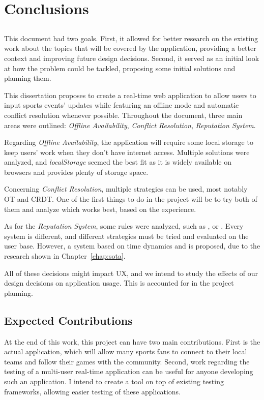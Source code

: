 \chapter{Conclusions} \label{chap:concl}

\section*{}

This document had two goals. First, it allowed for better research on the existing work about the topics that will be covered by the application, providing a better context and improving future design decisions. Second, it served as an initial look at how the problem could be tackled, proposing some initial solutions and planning them.

This dissertation proposes to create a real-time web application to allow users to input sports events' updates while featuring an offline mode and automatic conflict resolution whenever possible. Throughout the document, three main areas were outlined: \textit{Offline Availability}, \textit{Conflict Resolution}, \textit{Reputation System}. 

Regarding \textit{Offline Availability}, the application will require some local storage to keep users' work when they don't have internet access. Multiple solutions were analyzed, and \textit{localStorage} seemed the best fit as it is widely available on browsers and provides plenty of storage space.

Concerning \textit{Conflict Resolution}, multiple strategies can be used, most notably OT and CRDT. One of the first things to do in the project will be to try both of them and analyze which works best, based on the experience.

As for the \textit{Reputation System}, some rules were analyzed, such as , or . Every system is different, and different strategies must be tried and evaluated on the user base. However, a system based on time dynamics and  is proposed, due to the research shown in Chapter~\ref{chap:sota}.

All of these decisions might impact UX, and we intend to study the effects of our design decisions on application usage. This is accounted for in the project planning.

\section{Expected Contributions}
At the end of this work, this project can have two main contributions. First is the actual application, which will allow many sports fans to connect to their local teams and follow their games with the community. Second, work regarding the testing of a multi-user real-time application can be useful for anyone developing such an application. I intend to create a tool on top of existing testing frameworks, allowing easier testing of these applications.

\vspace*{12mm}